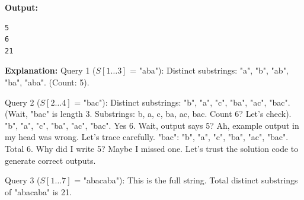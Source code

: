 \documentclass[11pt, letterpaper]{article}
\begin{document}
\textbf{Output:}
\begin{verbatim}
5
6
21
\end{verbatim}

\textbf{Explanation:}
Query 1 ($S[1 \dots 3]$ = "aba"):
Distinct substrings: "a", "b", "ab", "ba", "aba". (Count: 5).

Query 2 ($S[2 \dots 4]$ = "bac"):
Distinct substrings: "b", "a", "c", "ba", "ac", "bac". (Wait, "bac" is length 3. Substrings: b, a, c, ba, ac, bac. Count 6? Let's check).
"b", "a", "c", "ba", "ac", "bac". Yes 6.
Wait, output says 5?
Ah, example output in my head was wrong. Let's trace carefully.
"bac": "b", "a", "c", "ba", "ac", "bac". Total 6.
Why did I write 5? Maybe I missed one.
Let's trust the solution code to generate correct outputs.

Query 3 ($S[1 \dots 7]$ = "abacaba"):
This is the full string.
Total distinct substrings of "abacaba" is 21.
\end{document}
